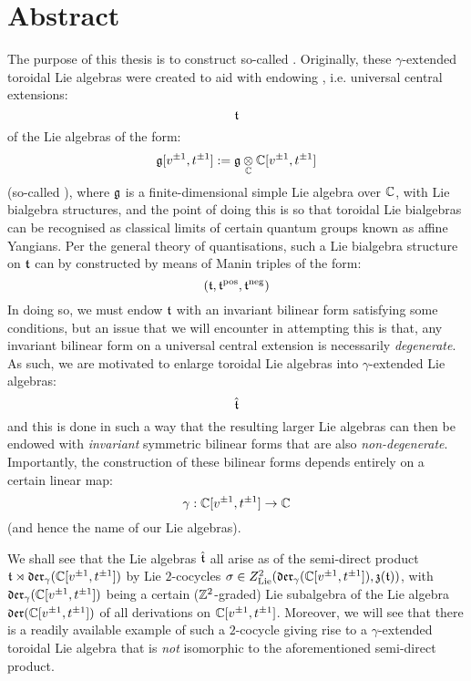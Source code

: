 \section*{Abstract}
    The purpose of this thesis is to construct so-called . Originally, these $\gamma$-extended toroidal Lie algebras were created to aid with endowing , i.e. universal central extensions:
        $$\mathfrak{t}$$
    of the Lie algebras of the form:
        $$\g[v^{\pm 1}, t^{\pm 1}] := \g \tensor_{\bbC} \bbC[v^{\pm 1}, t^{\pm 1}]$$
    (so-called ), where $\mathfrak{g}$ is a finite-dimensional simple Lie algebra over $\mathbb{C}$, with Lie bialgebra structures, and the point of doing this is so that toroidal Lie bialgebras can be recognised as classical limits of certain quantum groups known as affine Yangians. Per the general theory of quantisations, such a Lie bialgebra structure on $\mathfrak{t}$ can by constructed by means of Manin triples of the form:
        $$(\mathfrak{t}, \mathfrak{t}^{\mathrm{pos}}, \mathfrak{t}^{\mathrm{neg}})$$
    In doing so, we must endow $\mathfrak{t}$ with an invariant bilinear form satisfying some conditions, but an issue that we will encounter in attempting this is that, any invariant bilinear form on a universal central extension is necessarily \textit{degenerate}. As such, we are motivated to enlarge toroidal Lie algebras into $\gamma$-extended Lie algebras:
        $$\hat{\mathfrak{t}}$$
    and this is done in such a way that the resulting larger Lie algebras can then be endowed with \textit{invariant} symmetric bilinear forms that are also \textit{non-degenerate}. Importantly, the construction of these bilinear forms depends entirely on a certain linear map:
        $$\gamma: \mathbb{C}[v^{\pm 1}, t^{\pm 1}] \to \mathbb{C}$$
    (and hence the name of our Lie algebras).
    
    We shall see that the Lie algebras $\hat{\mathfrak{t}}$ all arise as  of the semi-direct product $\mathfrak{t} \rtimes \mathfrak{der}_{\gamma}(\mathbb{C}[v^{\pm 1}, t^{\pm 1}])$ by Lie $2$-cocycles $\sigma \in Z^2_{\mathrm{Lie}}(\mathfrak{der}_{\gamma}(\mathbb{C}[v^{\pm 1}, t^{\pm 1}]), \mathfrak{z}(\mathfrak{t}))$, with $\mathfrak{der}_{\gamma}(\mathbb{C}[v^{\pm 1}, t^{\pm 1}])$ being a certain ($\mathbb{Z}^2$-graded) Lie subalgebra of the Lie algebra $\mathfrak{der}(\mathbb{C}[v^{\pm 1}, t^{\pm 1}])$ of all derivations on $\mathbb{C}[v^{\pm 1}, t^{\pm 1}]$. Moreover, we will see that there is a readily available example of such a $2$-cocycle giving rise to a $\gamma$-extended toroidal Lie algebra that is \textit{not} isomorphic to the aforementioned semi-direct product.